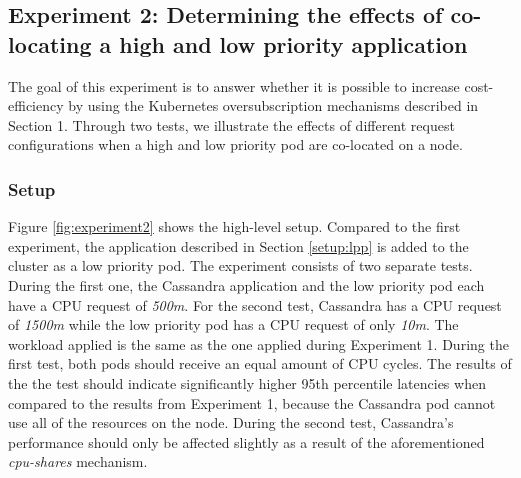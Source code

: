 %

\subsection{Experiment 2: Determining the effects of co-locating a high and low priority application}
The goal of this experiment is to answer whether it is possible to increase cost-efficiency by using the Kubernetes oversubscription mechanisms described in Section 1. Through two tests, we illustrate the effects of different request configurations when a high and low priority pod are co-located on a node.

\subsubsection{Setup}
Figure \ref{fig:experiment2} shows the high-level setup. Compared to the first experiment, the application described in Section \ref{setup:lpp} is added to the cluster as a low priority pod. The experiment consists of two separate tests. During the first one, the Cassandra application and the low priority pod each have a CPU request of \textit{500m}. For the second test, Cassandra has a CPU request of \textit{1500m} while the low priority pod has a CPU request of only \textit{10m}. The workload applied is the same as the one applied during Experiment 1. During the first test, both pods should receive an equal amount of CPU cycles. The results of the the test should indicate significantly higher 95th percentile latencies when compared to the results from Experiment 1, because the Cassandra pod cannot use all of the resources on the node. During the second test, Cassandra's performance should only be affected slightly as a result of the aforementioned \textit{cpu-shares} mechanism.

